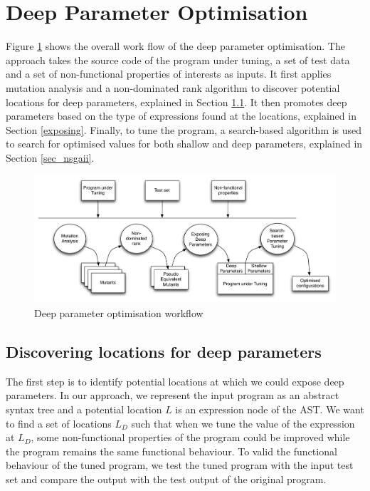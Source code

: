 \section{Deep Parameter Optimisation}

Figure \ref{system} shows the overall work flow of the deep parameter optimisation. The approach takes the source code of the program under tuning, a set of test data and a set of non-functional properties of interests as inputs. 
It first applies mutation analysis and a non-dominated rank algorithm to discover potential locations for deep parameters, explained in Section \ref{discovering}. It then promotes deep parameters based on the type of expressions found at the locations, explained in Section \ref{exposing}. Finally, to tune the program, a search-based algorithm is used to search for optimised values for both shallow and deep parameters, explained in Section \ref{sec_nsgaii}.

\begin{figure}[htbp]
\centering
\includegraphics[width=6.2in]{pics/new_system}
\caption{Deep parameter optimisation workflow}\label{system}
\end{figure}

\subsection{Discovering locations for deep parameters}
\label{discovering}
The first step is to identify potential locations at which we could expose deep parameters. 
In our approach, we represent the input program as an abstract syntax tree and a potential location $L$ is an expression node of the AST. 
We want to find a set of locations $L_D$ such that when we tune the value of the expression at $L_D$, some non-functional properties of the program could be improved while the program remains the same functional behaviour. 
To valid the functional behaviour of the tuned program, we test the tuned program with the input test set and compare the output with the test output of the original program.

